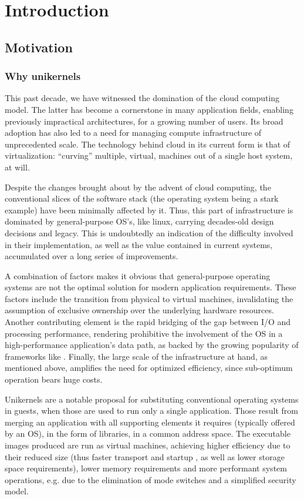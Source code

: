 \chapter{Introduction}

\section{Motivation}

\subsection{Why unikernels}

This past decade, we have witnessed the domination of the cloud computing model.
The latter has become a cornerstone in many application fields, enabling
previously impractical architectures, for a growing number of users. Its broad
adoption has also led to a need for managing compute infrastructure of
unprecedented scale. The technology behind cloud in its current form is that of
virtualization: ``curving'' multiple, virtual, machines out of a single host
system, at will.

Despite the changes brought about by the advent of cloud computing, the
conventional slices of the software stack (the operating system being a stark
example) have been minimally affected by it. Thus, this part of infrastructure
is dominated by general-purpose OS's, like linux, carrying decades-old design
decisions and legacy. This is undoubtedly an indication of the difficulty
involved in their implementation, as well as the value contained in current
systems, accumulated over a long series of improvements.

A combination of factors makes it obvious that general-purpose operating systems
are not the optimal solution for modern application requirements. These factors
include the transition from physical to virtual machines, invalidating the
assumption of exclusive ownership over the underlying hardware resources.
Another contributing element is the rapid bridging of the gap between I/O and
processing performance, rendering prohibitive the involvement of the OS in a
high-performance application's data path, as backed by the growing popularity of
frameworks like \cite{dpdk, spdk}. Finally, the large scale of the
infrastructure at hand, as mentioned above, amplifies the need for optimized
efficiency, since sub-optimum operation bears huge costs.

Unikernels are a notable proposal for substituting conventional operating
systems in guests, when those are used to run only a single application. Those
result from merging an application with all supporting elements it requires
(typically offered by an OS), in the form of libraries, in a common address
space. The executable images produced are run as virtual machines, achieving
higher efficiency due to their reduced size (thus faster transport and startup
\cite{jitsu}, as well as lower storage space requirements), lower memory
requirements and more performant system operations, e.g. due to the elimination
of mode switches and a simplified security model.


